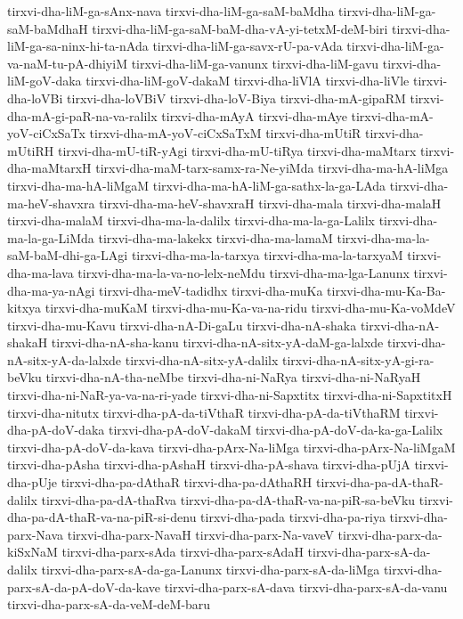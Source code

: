 {tirxvi-dha-liM-ga-sAnx-nava
tirxvi-dha-liM-ga-saM-baMdha
tirxvi-dha-liM-ga-saM-baMdhaH
tirxvi-dha-liM-ga-saM-baM-dha-vA-yi-tetxM-deM-biri
tirxvi-dha-liM-ga-sa-ninx-hi-ta-nAda
tirxvi-dha-liM-ga-savx-rU-pa-vAda
tirxvi-dha-liM-ga-va-naM-tu-pA-dhiyiM
tirxvi-dha-liM-ga-vanunx
tirxvi-dha-liM-gavu
tirxvi-dha-liM-goV-daka
tirxvi-dha-liM-goV-dakaM
tirxvi-dha-liVlA
tirxvi-dha-liVle
tirxvi-dha-loVBi
tirxvi-dha-loVBiV
tirxvi-dha-loV-Biya
tirxvi-dha-mA-gipaRM
tirxvi-dha-mA-gi-paR-na-va-ralilx
tirxvi-dha-mAyA
tirxvi-dha-mAye
tirxvi-dha-mA-yoV-ciCxSaTx
tirxvi-dha-mA-yoV-ciCxSaTxM
tirxvi-dha-mUtiR
tirxvi-dha-mUtiRH
tirxvi-dha-mU-tiR-yAgi
tirxvi-dha-mU-tiRya
tirxvi-dha-maMtarx
tirxvi-dha-maMtarxH
tirxvi-dha-maM-tarx-samx-ra-Ne-yiMda
tirxvi-dha-ma-hA-liMga
tirxvi-dha-ma-hA-liMgaM
tirxvi-dha-ma-hA-liM-ga-sathx-la-ga-LAda
tirxvi-dha-ma-heV-shavxra
tirxvi-dha-ma-heV-shavxraH
tirxvi-dha-mala
tirxvi-dha-malaH
tirxvi-dha-malaM
tirxvi-dha-ma-la-dalilx
tirxvi-dha-ma-la-ga-Lalilx
tirxvi-dha-ma-la-ga-LiMda
tirxvi-dha-ma-lakekx
tirxvi-dha-ma-lamaM
tirxvi-dha-ma-la-saM-baM-dhi-ga-LAgi
tirxvi-dha-ma-la-tarxya
tirxvi-dha-ma-la-tarxyaM
tirxvi-dha-ma-lava
tirxvi-dha-ma-la-va-no-lelx-neMdu
tirxvi-dha-ma-lga-Lanunx
tirxvi-dha-ma-ya-nAgi
tirxvi-dha-meV-tadidhx
tirxvi-dha-muKa
tirxvi-dha-mu-Ka-Ba-kitxya
tirxvi-dha-muKaM
tirxvi-dha-mu-Ka-va-na-ridu
tirxvi-dha-mu-Ka-voMdeV
tirxvi-dha-mu-Kavu
tirxvi-dha-nA-Di-gaLu
tirxvi-dha-nA-shaka
tirxvi-dha-nA-shakaH
tirxvi-dha-nA-sha-kanu
tirxvi-dha-nA-sitx-yA-daM-ga-lalxde
tirxvi-dha-nA-sitx-yA-da-lalxde
tirxvi-dha-nA-sitx-yA-dalilx
tirxvi-dha-nA-sitx-yA-gi-ra-beVku
tirxvi-dha-nA-tha-neMbe
tirxvi-dha-ni-NaRya
tirxvi-dha-ni-NaRyaH
tirxvi-dha-ni-NaR-ya-va-na-ri-yade
tirxvi-dha-ni-Sapxtitx
tirxvi-dha-ni-SapxtitxH
tirxvi-dha-nitutx
tirxvi-dha-pA-da-tiVthaR
tirxvi-dha-pA-da-tiVthaRM
tirxvi-dha-pA-doV-daka
tirxvi-dha-pA-doV-dakaM
tirxvi-dha-pA-doV-da-ka-ga-Lalilx
tirxvi-dha-pA-doV-da-kava
tirxvi-dha-pArx-Na-liMga
tirxvi-dha-pArx-Na-liMgaM
tirxvi-dha-pAsha
tirxvi-dha-pAshaH
tirxvi-dha-pA-shava
tirxvi-dha-pUjA
tirxvi-dha-pUje
tirxvi-dha-pa-dAthaR
tirxvi-dha-pa-dAthaRH
tirxvi-dha-pa-dA-thaR-dalilx
tirxvi-dha-pa-dA-thaRva
tirxvi-dha-pa-dA-thaR-va-na-piR-sa-beVku
tirxvi-dha-pa-dA-thaR-va-na-piR-si-denu
tirxvi-dha-pada
tirxvi-dha-pa-riya
tirxvi-dha-parx-Nava
tirxvi-dha-parx-NavaH
tirxvi-dha-parx-Na-vaveV
tirxvi-dha-parx-da-kiSxNaM
tirxvi-dha-parx-sAda
tirxvi-dha-parx-sAdaH
tirxvi-dha-parx-sA-da-dalilx
tirxvi-dha-parx-sA-da-ga-Lanunx
tirxvi-dha-parx-sA-da-liMga
tirxvi-dha-parx-sA-da-pA-doV-da-kave
tirxvi-dha-parx-sA-dava
tirxvi-dha-parx-sA-da-vanu
tirxvi-dha-parx-sA-da-veM-deM-baru
}
